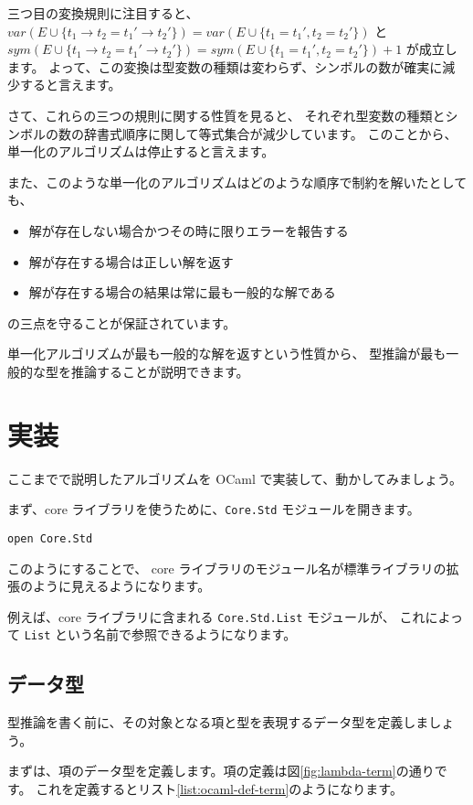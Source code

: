 三つ目の変換規則に注目すると、
$\mathit{var}(E \cup \{t_1 \to t_2 = t_1' \to t_2'\}) =
 \mathit{var}(E \cup \{t_1 = t_1', t_2 = t_2'\})$
と
$\mathit{sym}(E \cup \{t_1 \to t_2 = t_1' \to t_2'\}) =
 \mathit{sym}(E \cup \{t_1 = t_1', t_2 = t_2'\})+1$
が成立します。
よって、この変換は型変数の種類は変わらず、シンボルの数が確実に減少すると言えます。

さて、これらの三つの規則に関する性質を見ると、
それぞれ型変数の種類とシンボルの数の辞書式順序に関して等式集合が減少しています。
このことから、単一化のアルゴリズムは停止すると言えます。

また、このような単一化のアルゴリズムはどのような順序で制約を解いたとしても、
\begin{itemize}
  \item 解が存在しない場合かつその時に限りエラーを報告する
  \item 解が存在する場合は正しい解を返す
  \item 解が存在する場合の結果は常に最も一般的な解である
\end{itemize}
の三点を守ることが保証されています。

単一化アルゴリズムが最も一般的な解を返すという性質から、
型推論が最も一般的な型を推論することが説明できます。

\section{実装}

ここまでで説明したアルゴリズムを OCaml で実装して、動かしてみましょう。

まず、core ライブラリを使うために、\texttt{Core.Std} モジュールを開きます。

\begin{lstlisting}
open Core.Std
\end{lstlisting}

このようにすることで、
core ライブラリのモジュール名が標準ライブラリの拡張のように見えるようになります。

例えば、core ライブラリに含まれる \texttt{Core.Std.List} モジュールが、
これによって \texttt{List} という名前で参照できるようになります。

\subsection{データ型}

型推論を書く前に、その対象となる項と型を表現するデータ型を定義しましょう。

まずは、項のデータ型を定義します。項の定義は図\ref{fig:lambda-term}の通りです。
これを定義するとリスト\ref{list:ocaml-def-term}のようになります。

